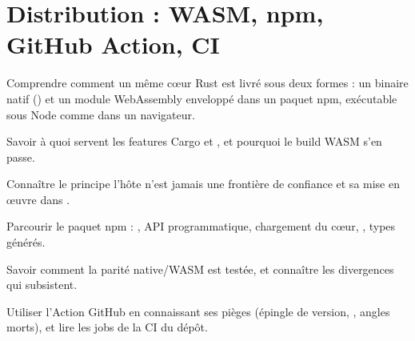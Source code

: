\chapter{Distribution : WASM, npm, GitHub Action, CI}
\label{chap:distribution}

\begin{objectifs}
  \item Comprendre comment un même cœur Rust est livré sous deux formes : un binaire natif () et un module WebAssembly enveloppé dans un paquet npm, exécutable sous Node comme dans un navigateur.
  \item Savoir à quoi servent les features Cargo  et , et pourquoi le build WASM s'en passe.
  \item Connaître le principe \og l'hôte n'est jamais une frontière de confiance\fg{} et sa mise en œuvre dans .
  \item Parcourir le paquet npm : , API programmatique, chargement du cœur, , types  générés.
  \item Savoir comment la parité native/WASM est testée, et connaître les divergences qui subsistent.
  \item Utiliser l'Action GitHub en connaissant ses pièges (épingle de version, , angles morts), et lire les jobs de la CI du dépôt.
\end{objectifs}


